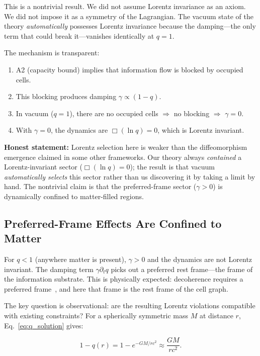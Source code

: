 \documentclass[aps,prd,twocolumn,showpacs,superscriptaddress,preprintnumbers]{revtex4-2}
\begin{document}
This is a nontrivial result.
We did not assume Lorentz invariance as an axiom.
We did not impose it as a symmetry of the Lagrangian.
The vacuum state of the theory \emph{automatically} possesses Lorentz invariance because the damping---the only term that could break it---vanishes identically at $q=1$.

The mechanism is transparent:
\begin{enumerate}
    \item A2 (capacity bound) implies that information flow is blocked by occupied cells.
    \item This blocking produces damping $\gamma\propto(1-q)$.
    \item In vacuum ($q=1$), there are no occupied cells $\Rightarrow$ no blocking $\Rightarrow$ $\gamma=0$.
    \item With $\gamma=0$, the dynamics are $\Box(\ln q)=0$, which is Lorentz invariant.
\end{enumerate}

\textbf{Honest statement:} Lorentz selection here is weaker than the diffeomorphism emergence claimed in some other frameworks.
Our theory always \emph{contained} a Lorentz-invariant sector ($\Box(\ln q)=0$); the result is that vacuum \emph{automatically selects} this sector rather than us discovering it by taking a limit by hand.
The nontrivial claim is that the preferred-frame sector ($\gamma>0$) is dynamically confined to matter-filled regions.

\subsection{Preferred-Frame Effects Are Confined to Matter}

For $q<1$ (anywhere matter is present), $\gamma>0$ and the dynamics are not Lorentz invariant.
The damping term $\gamma\partial_t q$ picks out a preferred rest frame---the frame of the information substrate.
This is physically expected: decoherence requires a preferred frame~\cite{Bassi:2013mta}, and here that frame is the rest frame of the cell graph.

The key question is observational: are the resulting Lorentz violations compatible with existing constraints?
For a spherically symmetric mass $M$ at distance $r$, Eq.~\eqref{eq:q_solution} gives:

\begin{equation}
1 - q(r) = 1 - e^{-GM/rc^2} \approx \frac{GM}{rc^2}.
\label{eq:lv_estimate}
\end{equation}
\end{document}
